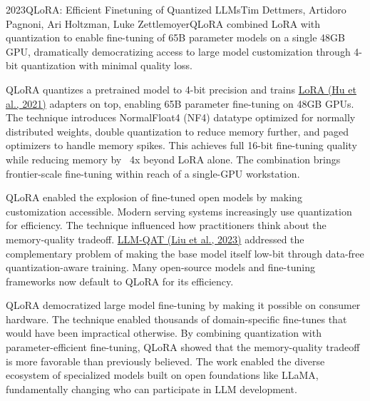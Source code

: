 
\begin{papersummary}{2023}{QLoRA: Efficient Finetuning of Quantized LLMs}{Tim Dettmers, Artidoro Pagnoni, Ari Holtzman, Luke Zettlemoyer}{QLoRA combined LoRA with quantization to enable fine-tuning of 65B parameter models on a single 48GB GPU, dramatically democratizing access to large model customization through 4-bit quantization with minimal quality loss.}

QLoRA quantizes a pretrained model to 4-bit precision and trains \hyperref[paper:hu-2021]{LoRA (Hu et al., 2021)} adapters on top, enabling 65B parameter fine-tuning on 48GB GPUs. The technique introduces NormalFloat4 (NF4) datatype optimized for normally distributed weights, double quantization to reduce memory further, and paged optimizers to handle memory spikes. This achieves full 16-bit fine-tuning quality while reducing memory by ~4x beyond LoRA alone. The combination brings frontier-scale fine-tuning within reach of a single-GPU workstation.

QLoRA enabled the explosion of fine-tuned open models by making customization accessible. Modern serving systems increasingly use quantization for efficiency. The technique influenced how practitioners think about the memory-quality tradeoff. \hyperref[paper:liu-2023-llm-qat]{LLM-QAT (Liu et al., 2023)} addressed the complementary problem of making the base model itself low-bit through data-free quantization-aware training. Many open-source models and fine-tuning frameworks now default to QLoRA for its efficiency.

QLoRA democratized large model fine-tuning by making it possible on consumer hardware. The technique enabled thousands of domain-specific fine-tunes that would have been impractical otherwise. By combining quantization with parameter-efficient fine-tuning, QLoRA showed that the memory-quality tradeoff is more favorable than previously believed. The work enabled the diverse ecosystem of specialized models built on open foundations like LLaMA, fundamentally changing who can participate in LLM development.

\end{papersummary}

